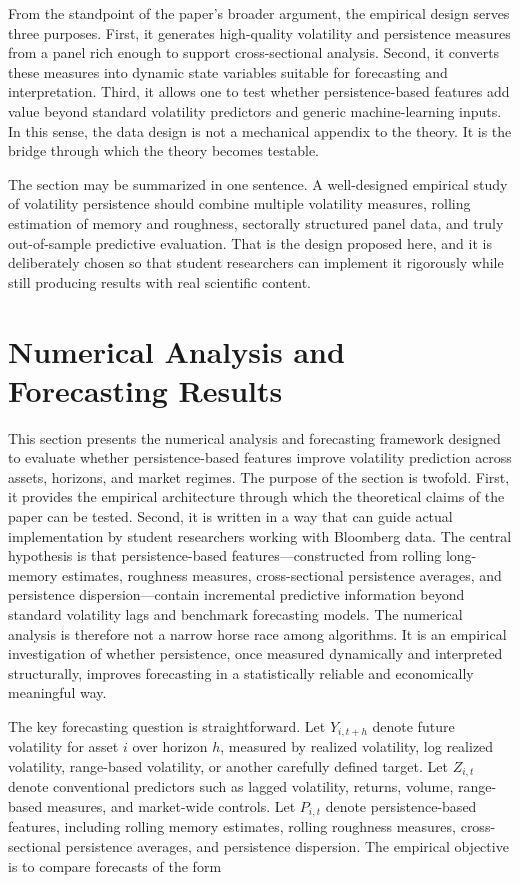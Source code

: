 \documentclass[12pt]{article}
\begin{document}
From the standpoint of the paper's broader argument, the empirical design serves three purposes. First, it generates high-quality volatility and persistence measures from a panel rich enough to support cross-sectional analysis. Second, it converts these measures into dynamic state variables suitable for forecasting and interpretation. Third, it allows one to test whether persistence-based features add value beyond standard volatility predictors and generic machine-learning inputs. In this sense, the data design is not a mechanical appendix to the theory. It is the bridge through which the theory becomes testable.

The section may be summarized in one sentence. A well-designed empirical study of volatility persistence should combine multiple volatility measures, rolling estimation of memory and roughness, sectorally structured panel data, and truly out-of-sample predictive evaluation. That is the design proposed here, and it is deliberately chosen so that student researchers can implement it rigorously while still producing results with real scientific content.



\section{Numerical Analysis and Forecasting Results}
\label{sec:results}

This section presents the numerical analysis and forecasting framework designed to evaluate whether persistence-based features improve volatility prediction across assets, horizons, and market regimes. The purpose of the section is twofold. First, it provides the empirical architecture through which the theoretical claims of the paper can be tested. Second, it is written in a way that can guide actual implementation by student researchers working with Bloomberg data. The central hypothesis is that persistence-based features---constructed from rolling long-memory estimates, roughness measures, cross-sectional persistence averages, and persistence dispersion---contain incremental predictive information beyond standard volatility lags and benchmark forecasting models. The numerical analysis is therefore not a narrow horse race among algorithms. It is an empirical investigation of whether persistence, once measured dynamically and interpreted structurally, improves forecasting in a statistically reliable and economically meaningful way.

The key forecasting question is straightforward. Let $Y_{i,t+h}$ denote future volatility for asset $i$ over horizon $h$, measured by realized volatility, log realized volatility, range-based volatility, or another carefully defined target. Let $Z_{i,t}$ denote conventional predictors such as lagged volatility, returns, volume, range-based measures, and market-wide controls. Let $P_{i,t}$ denote persistence-based features, including rolling memory estimates, rolling roughness measures, cross-sectional persistence averages, and persistence dispersion. The empirical objective is to compare forecasts of the form
\end{document}
